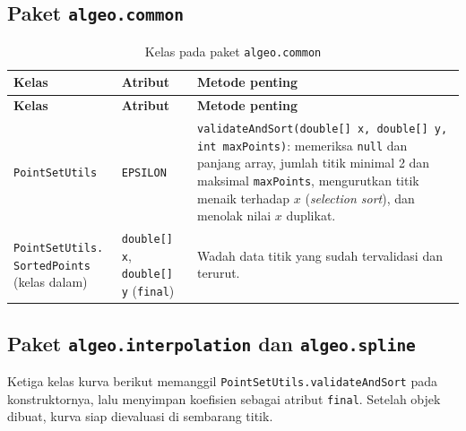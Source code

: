 \documentclass[12pt,a4paper]{report}
\begin{document}
\subsection{Paket \texttt{algeo.common}}

\begin{longtable}{L{3.3cm} L{3.4cm} L{7.8cm}}
\caption{Kelas pada paket \texttt{algeo.common}}\label{tab:kelas-common}\\
\toprule
\textbf{Kelas} & \textbf{Atribut} & \textbf{Metode penting} \\
\midrule
\endfirsthead
\toprule
\textbf{Kelas} & \textbf{Atribut} & \textbf{Metode penting} \\
\midrule
\endhead
\bottomrule
\endfoot
\texttt{PointSetUtils} & \texttt{EPSILON} &
\texttt{validateAndSort(double[] x, double[] y, int maxPoints)}: memeriksa
\texttt{null} dan panjang array, jumlah titik minimal 2 dan maksimal
\texttt{maxPoints}, mengurutkan titik menaik terhadap $x$ (\textit{selection
sort}), dan menolak nilai $x$ duplikat. \\
\addlinespace
\texttt{PointSetUtils. \newline SortedPoints} (kelas dalam) & \texttt{double[] x}, \texttt{double[] y} (\texttt{final}) &
Wadah data titik yang sudah tervalidasi dan terurut. \\
\end{longtable}

\subsection{Paket \texttt{algeo.interpolation} dan \texttt{algeo.spline}}

Ketiga kelas kurva berikut memanggil \texttt{PointSetUtils.validateAndSort}
pada konstruktornya, lalu menyimpan koefisien sebagai atribut \texttt{final}.
Setelah objek dibuat, kurva siap dievaluasi di sembarang titik.
\end{document}
